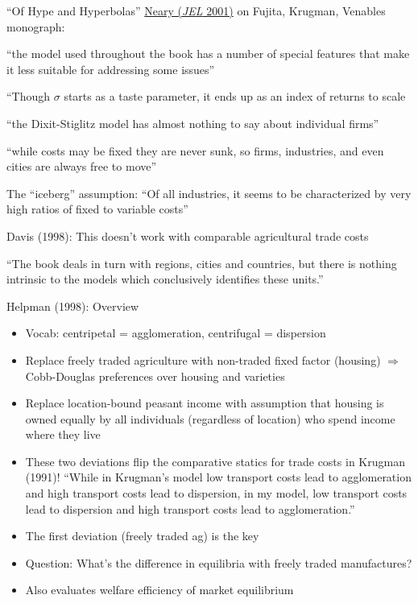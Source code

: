 \documentclass[11pt,notes=hide,aspectratio=169]{beamer}
\begin{document}
\begin{frame}{``Of Hype and Hyperbolas''}
\href{https://www.aeaweb.org/articles?id=10.1257/jel.39.2.536}{Neary (\textit{JEL} 2001)} on Fujita, Krugman, Venables monograph:
\begin{itemize}
{\small
\item ``the model used throughout the book has a number of special features that make it less suitable for addressing some issues''
\item ``Though $\sigma$ starts as a taste parameter, it ends up as an index of returns to scale
\item ``the Dixit-Stiglitz model has almost nothing to say about individual firms''
\item ``while costs may be fixed they are never sunk, so firms, industries, and even cities are always free to move''
\item The ``iceberg'' assumption: ``Of all industries, it seems to be characterized by very high ratios of fixed to variable costs''
\item Davis (1998): This doesn't work with comparable agricultural trade costs
\item ``The book deals in turn with regions, cities and countries, but there is nothing intrinsic to the models which conclusively identifies these units.''
}
\end{itemize}
\end{frame}
\begin{frame}{Helpman (1998): Overview}
\begin{itemize}
	\item Vocab: centripetal = agglomeration, centrifugal  = dispersion
	\item Replace freely traded agriculture with non-traded fixed factor (housing) $\Rightarrow$ Cobb-Douglas preferences over housing and varieties
	\item Replace location-bound peasant income with assumption that housing is owned equally by all individuals (regardless of location) who spend income where they live
	\item These two deviations flip the comparative statics for trade costs in Krugman (1991)! ``While in Krugman's model low transport costs lead to agglomeration and high transport costs lead to dispersion, in my model, low transport costs lead to dispersion and high transport costs lead to agglomeration.''
	\item The first deviation (freely traded ag) is the key
	\item Question: What's the difference in equilibria with freely traded manufactures?
	\item Also evaluates welfare efficiency of market equilibrium
\end{itemize}
\end{frame}
\end{document}
